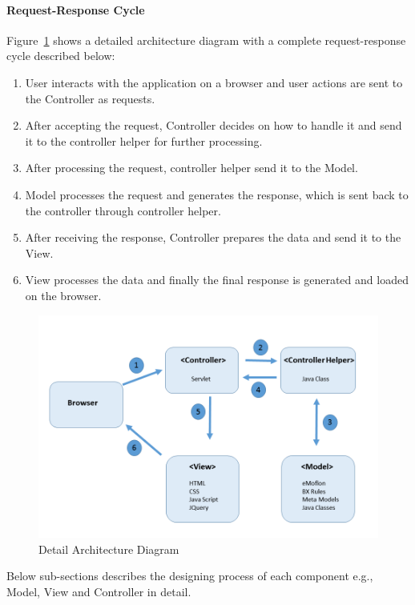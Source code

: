 \paragraph{Request-Response Cycle} 
Figure~\ref{fig:Detail_Architecture_Diagram} shows a detailed architecture diagram with a complete request-response cycle described below:
\begin{enumerate}
	\item {User interacts with the application on a browser and user actions are sent to the Controller as requests.}
	\item {After accepting the request, Controller decides on how to handle it and send it to the controller helper for further processing.}
	\item {After processing the request, controller helper send it to the Model.}
	\item {Model processes the request and generates the response, which is sent back to the controller through controller helper.}
	\item {After receiving the response, Controller prepares the data and send it to the View.}
	\item {View processes the data and finally the final response is generated and loaded on the browser.}
\end{enumerate}
\begin{figure}
	\includegraphics[width=1\textwidth]{figures/Detail_Arch}
	\caption{Detail Architecture Diagram}
	\label{fig:Detail_Architecture_Diagram}
\end{figure}

Below sub-sections describes the designing process of each component e.g., Model, View and Controller in detail.
